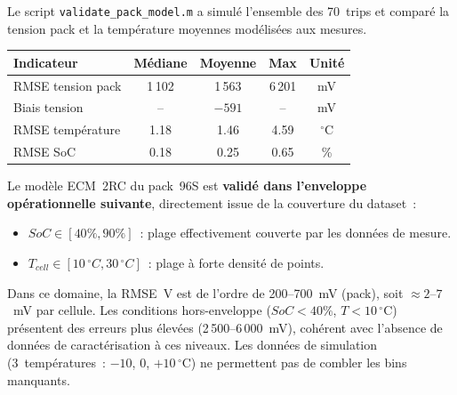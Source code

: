 \documentclass[a4paper,11pt]{article}
\begin{document}
Le script \texttt{validate\_pack\_model.m} a simulé l'ensemble des 70~trips et
comparé la tension pack et la température moyennes modélisées aux mesures.

\begin{center}
\small\renewcommand{\arraystretch}{1.4}
\begin{tabular}{lcccc}
\toprule
\textbf{Indicateur} & \textbf{Médiane} & \textbf{Moyenne} & \textbf{Max} & \textbf{Unité} \\
\midrule
RMSE tension pack & 1\,102 & 1\,563 & 6\,201 & mV \\
Biais tension & -- & $-591$ & -- & mV \\
RMSE température & 1.18 & 1.46 & 4.59 & $^\circ$C \\
RMSE SoC & 0.18 & 0.25 & 0.65 & \% \\
\bottomrule
\end{tabular}
\end{center}

\begin{infobox}
Le modèle ECM~2RC du pack~96S est \textbf{validé dans l'enveloppe opérationnelle
suivante}, directement issue de la couverture du dataset~:
\begin{itemize}[nosep]
  \item $SoC \in [40\%, 90\%]$~: plage effectivement couverte par les données de mesure.
  \item $T_{cell} \in [10\,^\circ C, 30\,^\circ C]$~: plage à forte densité de points.
\end{itemize}
Dans ce domaine, la RMSE~V est de l'ordre de 200--700~mV (pack), soit
$\approx 2$--$7$~mV par cellule. Les conditions hors-enveloppe ($SoC < 40\%$,
$T < 10\,^\circ$C) présentent des erreurs plus élevées (2\,500--6\,000~mV),
cohérent avec l'absence de données de caractérisation à ces niveaux.
Les données de simulation (3~températures~: $-10$, $0$, $+10\,^\circ$C)
ne permettent pas de combler les bins manquants.
\end{infobox}
\end{document}
